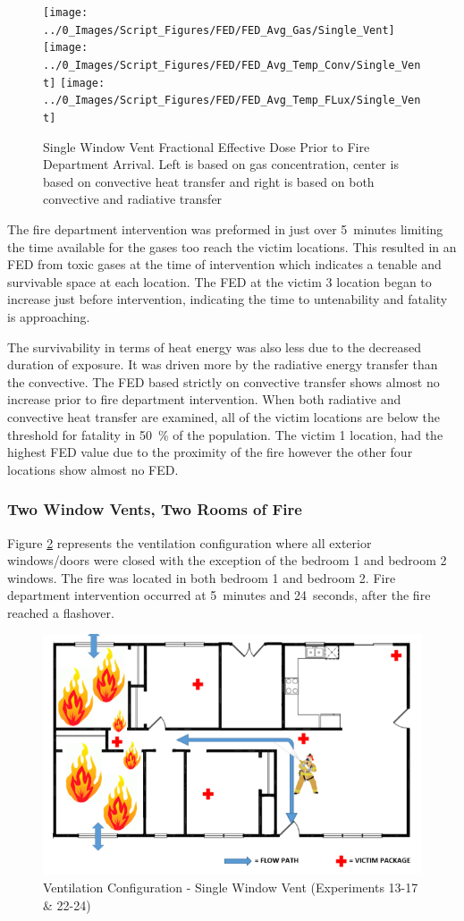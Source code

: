 \documentclass[12pt,oneside]{book}
\begin{document}
\begin{figure}[H]
	\centering
	\texttt{[image: ../0\_Images/Script\_Figures/FED/FED\_Avg\_Gas/Single\_Vent]}
	\texttt{[image: ../0\_Images/Script\_Figures/FED/FED\_Avg\_Temp\_Conv/Single\_Vent]} 
	\texttt{[image: ../0\_Images/Script\_Figures/FED/FED\_Avg\_Temp\_FLux/Single\_Vent]}
	\caption[Single Window Vent Fractional Effective Dose]{Single Window Vent Fractional Effective Dose Prior to Fire Department Arrival. Left is based on gas concentration, center is based on convective heat transfer and right is based on both convective and radiative transfer}
	\label{fig:FED_SingleVent}
\end{figure}

The fire department intervention was preformed in just over 5~minutes limiting the time available for the gases too reach the victim locations. This resulted in an FED from toxic gases at the time of intervention which indicates a tenable and survivable space at each location. The FED at the victim 3 location began to increase just before intervention, indicating the time to untenability and fatality is approaching. 

The survivability in terms of heat energy was also less due to the decreased duration of exposure. It was driven more by the radiative energy transfer than the convective. The FED based strictly on convective transfer shows almost no increase prior to fire department intervention. When both radiative and convective heat transfer are examined, all of the victim locations are below the threshold for fatality in 50~\% of the population. The victim 1 location, had the highest FED value due to the proximity of the fire however the other four locations show almost no FED. 

\subsubsection{Two Window Vents, Two Rooms of Fire}

Figure \ref{fig:Vent_Profile-Two_Vent} represents the ventilation configuration where all exterior windows/doors were closed with the exception of the bedroom 1 and bedroom 2 windows. The fire was located in both bedroom 1 and bedroom 2. Fire department intervention occurred at 5~minutes and 24~seconds, after the fire reached a flashover. 

\begin{figure}[H]
	\centering
	\includegraphics[width=.65\textwidth]{../0_Images/Ventilation_Configurations/Two_Vent.png}
	\caption{Ventilation Configuration - Single Window Vent (Experiments 13-17 \& 22-24)}
	\label{fig:Vent_Profile-Two_Vent}
\end{figure}
\end{document}
